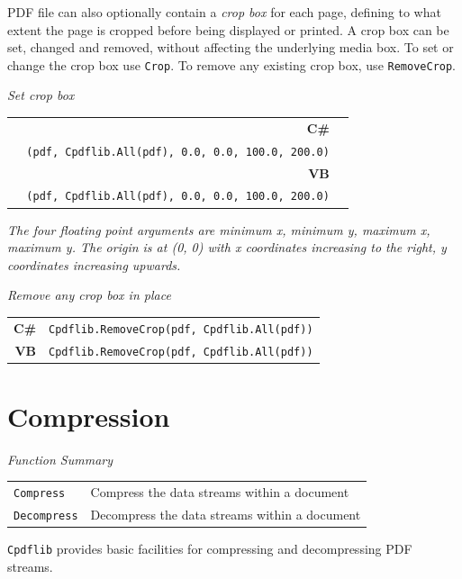 \documentclass[a4paper]{memoir}
\begin{document}
  PDF file can also optionally contain a \textit{crop box} for each page,
defining to what extent the page is cropped before being displayed or printed.
A crop box can be set, changed and removed, without affecting the underlying
media box. To set or change the crop box use \verb!Crop!. To remove any
existing crop box, use \verb!RemoveCrop!.
\begin{framed}
\noindent\textit{Set crop box}

\vspace{2mm}
\noindent\begin{tabular}{rl}
\small\sffamily\textbf{C\#} &
\begin{minipage}{4in}
\small\verb!Cpdflib.Crop!\\
\verb!  (pdf, Cpdflib.All(pdf), 0.0, 0.0, 100.0, 200.0)!
\end{minipage}\\[5mm]
\small\sffamily\textbf{VB} &
\begin{minipage}{4in}
\small\verb!Cpdflib.Crop!\\
\verb!  (pdf, Cpdflib.All(pdf), 0.0, 0.0, 100.0, 200.0)!
\end{minipage}\\[5mm]
\end{tabular}


\vspace{2mm}
\noindent\textit{The four floating point arguments are minimum x, minimum y, maximum x, maximum
  y. The origin is at (0, 0) with x coordinates increasing to the right, y coordinates increasing upwards.}
\end{framed}

\begin{framed}
\noindent\textit{Remove any crop box in place}

\vspace{2mm}
\noindent\begin{tabular}{rl}
\small\sffamily\textbf{C\#} &
\begin{minipage}{4in}
\small\verb!Cpdflib.RemoveCrop(pdf, Cpdflib.All(pdf))!
\end{minipage}\\[5mm]
\small\sffamily\textbf{VB} &
\begin{minipage}{4in}
\small\verb!Cpdflib.RemoveCrop(pdf, Cpdflib.All(pdf))!
\end{minipage}\\[5mm]
\end{tabular}
\end{framed}

\chapter{Compression}
\begin{framed}
\noindent\textit{Function Summary}\\[2mm]
\noindent\begin{tabular}{ll}
\verb!Compress! & Compress the data streams within a document\\
\verb!Decompress! & Decompress the data streams within a document
\end{tabular}
\end{framed}
\texttt{Cpdflib} provides basic facilities for compressing and decompressing PDF streams.
\end{document}
